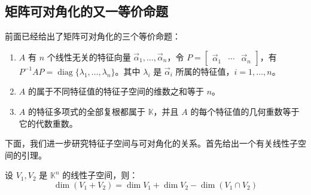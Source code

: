 \subsection{矩阵可对角化的又一等价命题}

前面已经给出了矩阵可对角化的三个等价命题：
\begin{enumerate}
	\item $A$ 有 $n$ 个线性无关的特征向量 $\vec \alpha_1, \ldots, \vec \alpha_n$，令 $P = \begin{bmatrix} \vec \alpha_1 & \cdots & \vec \alpha_n \end{bmatrix}$，有 $P^{-1} A P = \operatorname{diag} \{\lambda_1, \ldots, \lambda_n\}$。其中 $\lambda_i$ 是 $\vec \alpha_i$ 所属的特征值，$i = 1, \ldots, n$。

	\item $A$ 的属于不同特征值的特征子空间的维数之和等于 $n$。

	\item $A$ 的特征多项式的全部复根都属于 $\mathbb K$，并且 $A$ 的每个特征值的几何重数等于它的代数重数。
\end{enumerate}

下面，我们进一步研究特征子空间与可对角化的关系。首先给出一个有关线性子空间的引理。

\begin{theorem}
	设 $V_1, V_2$ 是 $\mathbb K^n$ 的线性子空间，则：
	$$
	\dim(V_1 + V_2) = \dim V_1 + \dim V_2 - \dim (V_1 \cap V_2)
	$$
\end{theorem}

